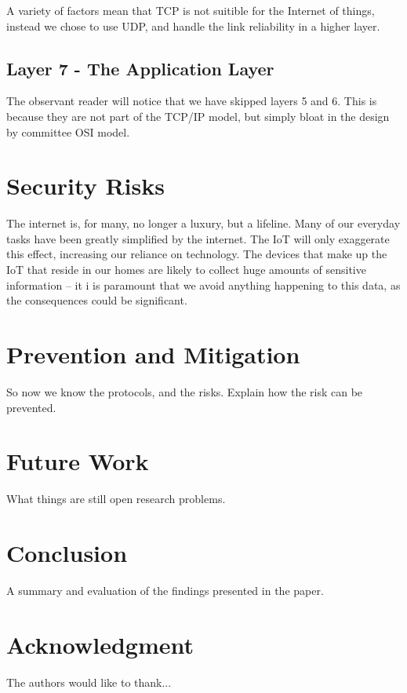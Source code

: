 \documentclass[journal]{IEEEtran}
\begin{document}
A variety of factors mean that TCP is not suitible for the Internet of things,
instead we chose to use UDP, and handle the link reliability in a higher layer.

\subsection{Layer 7 - The Application Layer}
The observant reader will notice that we have skipped layers 5 and 6. This is
because they are not part of the TCP/IP model, but simply bloat in the design
by committee OSI model.


\section{Security Risks}
The internet is, for many, no longer a luxury, but a lifeline. Many of our
everyday tasks have been greatly simplified by the internet. The IoT will only
exaggerate this effect, increasing our reliance on technology. The devices that
make up the IoT that reside in our homes are likely to collect huge amounts of
sensitive information -- it i is paramount that we avoid anything happening to
this data, as the consequences could be significant. 


\section{Prevention and Mitigation}
So now we know the protocols, and the risks. Explain how the risk can be
prevented.


\section{Future Work}
What things are still open research problems. 


\section{Conclusion}
A summary and evaluation of the findings presented in the paper.



\section*{Acknowledgment}

The authors would like to thank...


\end{document}
